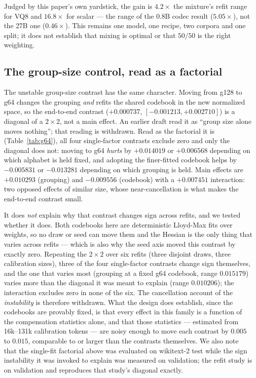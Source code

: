 \documentclass[11pt]{article}
\begin{document}
Judged by this paper's own yardstick, the gain is $4.2\times$ the mixture's
refit range for VQ8 and $16.8\times$ for scalar --- the range of the 0.8B codec
result ($5.05\times$), not the 27B one ($0.46\times$). This remains one model,
one recipe, two corpora and one split; it does not establish that mixing is
optimal or that $50/50$ is the right weighting.

\subsection{The group-size control, read as a factorial}

The unstable group-size contrast has the same character. Moving from g128 to
g64 changes the grouping \emph{and} refits the shared codebook in the new
normalized space, so the end-to-end contrast ($+0.000737$,
$[-0.001213,+0.002710]$) is a diagonal of a $2\times2$, not a main effect. An
earlier draft read it as ``group size alone moves nothing''; that reading is
withdrawn. Read as the factorial it is (Table~\ref{tab:g64}), all four
single-factor contrasts exclude zero and only the diagonal does not: moving to
g64 \emph{hurts} by $+0.014019$ or $+0.006568$ depending on which alphabet is
held fixed, and adopting the finer-fitted codebook helps by $-0.005831$ or
$-0.013281$ depending on which grouping is held. Main effects are $+0.010293$
(grouping) and $-0.009556$ (codebook) with a $+0.007451$ interaction: two
opposed effects of similar size, whose near-cancellation is what makes the
end-to-end contrast small.



It does \emph{not} explain why that contrast changes sign across refits, and we
tested whether it does. Both codebooks here are deterministic Lloyd-Max fits
over weights, so no draw or seed can move them and the Hessian is the only thing
that varies across refits --- which is also why the seed axis moved this
contrast by exactly zero. Repeating the $2\times2$ over six refits (three
disjoint draws, three calibration sizes), three of the four single-factor
contrasts change sign themselves, and the one that varies most (grouping at a
fixed g64 codebook, range $0.015179$) varies more than the diagonal it was meant
to explain (range $0.010206$); the interaction excludes zero in none of the six.
The cancellation account of the \emph{instability} is therefore withdrawn. What
the design does establish, since the codebooks are provably fixed, is that every
effect in this family is a function of the compensation statistics alone, and
that those statistics --- estimated from 16k--131k calibration tokens --- are
noisy enough to move each contrast by $0.005$ to $0.015$, comparable to or
larger than the contrasts themselves. We also note that the single-fit factorial
above was evaluated on wikitext-2 test while the sign instability it was invoked
to explain was measured on validation; the refit study is on validation and
reproduces that study's diagonal exactly.
\end{document}
